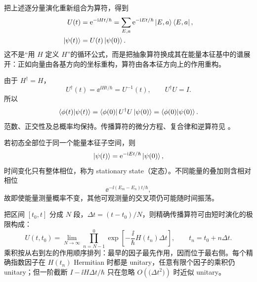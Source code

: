 把上述逐分量演化重新组合为算符，得到
\begin{align}
  U(t)&=\mathrm{e}^{-\mathrm{i} Ht/\hbar}
  =\sum_{E,a}\mathrm{e}^{-\mathrm{i} Et/\hbar}
    \left|E,a\right\rangle\left\langle E,a\right|,
  \label{eq:QM-C04-S03-propagator-spectral}\\
  \left|\psi(t)\right\rangle&=U(t)\left|\psi(0)\right\rangle.
  \label{eq:QM-C04-S03-state-propagation}
\end{align}
这不是“用 $H$ 定义 $H$”的循环公式，而是把抽象算符换成其在能量本征基中的谱展开：正如向量由各基方向的坐标重构，算符由各本征方向上的作用重构。

由于 $H^\dagger=H$，
\begin{equation}
  U^\dagger(t)=\ee^{\ii Ht/\hbar}=U^{-1}(t),
  \qquad
  U^\dagger U=I.
  \label{eq:QM-C04-S03-unitarity}
\end{equation}
所以
\begin{equation}
  \left\langle \phi(t) \middle| \psi(t) \right\rangle
  =\left\langle \phi(0)\right|U^\dagger U\left|\psi(0)\right\rangle
  =\left\langle \phi(0) \middle| \psi(0) \right\rangle.
  \label{eq:QM-C04-S03-inner-product-preservation}
\end{equation}
范数、正交性及总概率均保持。传播算符的微分方程、复合律和逆算符见
。

若初态全部位于同一个能量本征子空间，则
\begin{equation}
  \left|\psi(t)\right\rangle=\mathrm{e}^{-\mathrm{i} Et/\hbar}\left|\psi(0)\right\rangle,
  \label{eq:QM-C04-S03-stationary-state}
\end{equation}
时间变化只有整体相位，称为 stationary state（定态）。不同能量的叠加则含相对相位
\begin{equation}
  \ee^{-\ii(E_m-E_n)t/\hbar},
  \label{eq:QM-C04-S03-relative-energy-phase}
\end{equation}
故即使能量测量概率不变，其他可观测量的交叉项仍可能随时间振荡。



把区间 $[t_0,t]$ 分成 $N$ 段，$\Delta t=(t-t_0)/N$，则精确传播算符可由短时演化的极限构成：
\begin{equation}
  U(t,t_0)
  =\lim_{N\to\infty}
  \prod_{n=N-1}^{0}
  \exp\left[-\frac{\ii}{\hbar}H(t_n)\Delta t\right],
  \qquad t_n=t_0+n\Delta t.
  \label{eq:QM-C04-S03-time-sliced-product}
\end{equation}
乘积按从右到左的作用顺序排列：最早的因子最先作用，因而位于最右侧。每个精确指数因子在 $H(t_n)$ Hermitian 时都是 unitary，任意有限个因子的乘积仍 unitary；但一阶截断 $I-\ii H\Delta t/\hbar$ 只在忽略 $O(\bigl(\Delta t^2\bigr))$ 时近似 unitary。

